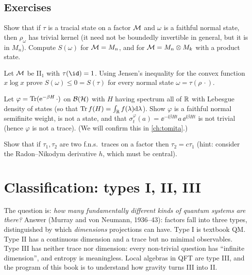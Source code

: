 \subsection*{Exercises}
\begin{exercise}\label{ex:traces:1}
Show that if $\tau$ is a tracial state on a factor $\mathcal{M}$ and $\omega$ is a faithful normal state, then $\rho_\omega$ has trivial kernel (it need not be boundedly invertible in general, but it is in $M_n$). Compute $S(\omega)$ for $\mathcal{M}=M_n$, and for $\mathcal{M}=M_n\otimes M_k$ with a product state.
\end{exercise}
\begin{exercise}\label{ex:traces:2}
Let $\mathcal{M}$ be II$_1$ with $\tau(\id)=1$. Using Jensen's inequality for the convex function $x\log x$ prove $S(\omega)\le0=S(\tau)$ for every normal state $\omega=\tau(\rho\,\cdot)$.
\end{exercise}
\begin{exercise}\label{ex:traces:3}
Let $\varphi=\operatorname{Tr}(\mathrm{e}^{-\beta H}\,\cdot)$ on $\mathcal{B}(\mathcal{H})$ with $H$ having spectrum all of $\mathbb{R}$ with Lebesgue density of states (so that $\operatorname{Tr} f(H)=\int_{\mathbb{R}}f(\lambda)\mathrm{d}\lambda$). Show $\varphi$ is a faithful normal semifinite weight, is not a state, and that $\sigma^\varphi_t(a)=\ee^{-\ii\beta Ht}a\,\ee^{\ii\beta Ht}$ is not trivial (hence $\varphi$ is not a trace). (We will confirm this in \cref{ch:tomita}.)
\end{exercise}
\begin{exercise}\label{ex:traces:4}
Show that if $\tau_1,\tau_2$ are two f.n.s.\ traces on a factor then $\tau_2=c\tau_1$ (hint: consider the Radon--Nikodym derivative $h$, which must be central).
\end{exercise}

\section{Classification: types I, II, III}\label{ch:classification}

\mshift{34mm}\begin{physmotiv}
The question is: \emph{how many fundamentally different kinds of quantum systems are there?} Answer (Murray and von Neumann, 1936--43): factors fall into three types, distinguished by which \emph{dimensions} projections can have. Type I is textbook QM. Type II has a continuous dimension and a trace but no minimal observables. Type III has neither trace nor dimension: every non-trivial question has ``infinite dimension'', and entropy is meaningless. Local algebras in QFT are type III, and the program of this book is to understand how gravity turns III into II.
\end{physmotiv}

